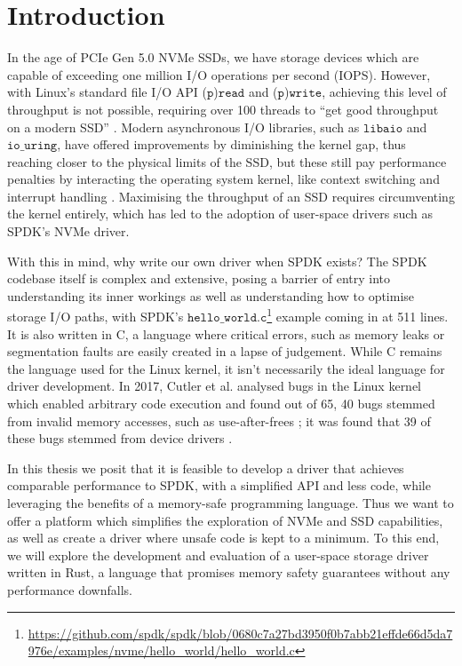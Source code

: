 \chapter{Introduction}\label{chapter:introduction}
In the age of PCIe Gen 5.0 NVMe SSDs, we have storage devices which are capable of exceeding one million I/O operations per second (IOPS). However, with Linux's standard file I/O API ($\texttt{p}$)$\texttt{read}$ and ($\texttt{p}$)$\texttt{write}$, achieving this level of throughput is not possible, requiring over 100 threads to ``get good throughput on a modern SSD'' \cite{haas2020exploiting}. Modern asynchronous I/O libraries, such as $\texttt{libaio}$ and $\texttt{io\_uring}$, have offered improvements by diminishing the kernel gap, thus reaching closer to the physical limits of the SSD, but these still pay performance penalties by interacting the operating system kernel, like context switching and interrupt handling \cite{storage_api}. Maximising the throughput of an SSD requires circumventing the kernel entirely, which has led to the adoption of user-space drivers such as SPDK's NVMe driver.

With this in mind, why write our own driver when SPDK exists? The SPDK codebase itself is complex and extensive, posing a barrier of entry into understanding its inner workings as well as understanding how to optimise storage I/O paths, with SPDK's $\texttt{hello\_world.c}$\footnote{\url{https://github.com/spdk/spdk/blob/0680c7a27bd3950f0b7abb21effde66d5da7976e/examples/nvme/hello_world/hello_world.c}} example coming in at 511 lines. It is also written in C, a language where critical errors, such as memory leaks or segmentation faults are easily created in a lapse of judgement. While C remains the language used for the Linux kernel, it isn't necessarily the ideal language for driver development. In 2017, Cutler et al. analysed bugs in the Linux kernel which enabled arbitrary code execution and found out of 65, 40 bugs stemmed from invalid memory accesses, such as use-after-frees \cite{cutler}; it was found that 39 of these bugs stemmed from device drivers \cite{driver_lang}.

In this thesis we posit that it is feasible to develop a driver that achieves comparable performance to SPDK, with a simplified API and less code, while leveraging the benefits of a memory-safe programming language. Thus we want to offer a platform which simplifies the exploration of NVMe and SSD capabilities, as well as create a driver where unsafe code is kept to a minimum. To this end, we will explore the development and evaluation of a user-space storage driver written in Rust, a language that promises memory safety guarantees without any performance downfalls.

